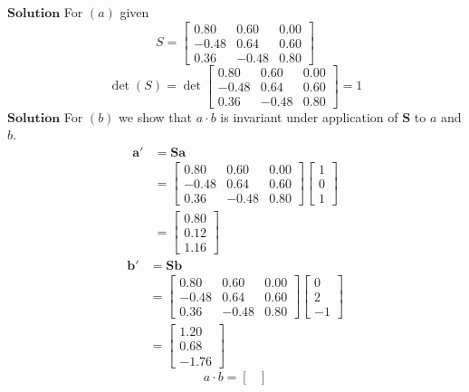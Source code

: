 \documentclass{article}
\begin{document}
\begin{flushleft}
$\boxed{\textbf{Solution}}$ For $(a)$ given 
$$
S=\begin{bmatrix}
0.80 & 0.60 & 0.00 \\
-0.48 & 0.64 & 0.60 \\
0.36 & -0.48 & 0.80
\end{bmatrix}
$$
$$
\operatorname{det}(S)=\operatorname{det}\begin{bmatrix}
0.80 & 0.60 & 0.00 \\
-0.48 & 0.64 & 0.60 \\
0.36 & -0.48 & 0.80
\end{bmatrix}=1
$$
$\boxed{\textbf{Solution}}$ For $(b)$ we show that $a \cdot b$ is invariant under application of $\mathbf{S}$ to $a$ and $b$.
$$
\begin{aligned}
\mathbf{a}' &=\mathbf{S} \mathbf{a} \\
&=\begin{bmatrix}
0.80 & 0.60 & 0.00 \\
-0.48 & 0.64 & 0.60 \\
0.36 & -0.48 & 0.80
\end{bmatrix}\begin{bmatrix}
1 \\
0 \\
1
\end{bmatrix} \\
&=\begin{bmatrix}
0.80 \\
0.12 \\
1.16
\end{bmatrix}
\end{aligned}
$$
$$
\begin{aligned}
\mathbf{b}' &=\mathbf{S} \mathbf{b} \\
&=\begin{bmatrix}
0.80 & 0.60 & 0.00 \\
-0.48 & 0.64 & 0.60 \\
0.36 & -0.48 & 0.80
\end{bmatrix}\begin{bmatrix}
0 \\
2 \\
-1
\end{bmatrix} \\
&=\begin{bmatrix}
1.20 \\
0.68 \\
-1.76
\end{bmatrix}
\end{aligned}
$$
$$
a \cdot b=\begin{bmatrix}

\end{bmatrix}$$
\end{flushleft}
\end{document}
